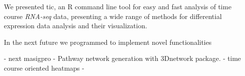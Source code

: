 We presented \gls{tic}, an R command line tool for easy and fast analysis of time course \textit{RNA-seq} data, presenting a wide range of methods for differential expression data analysis and their visualization.

In the next future we programmed to implement novel functionalities 

- next masigpro
- Pathway network generation with 3Dnetwork package.
- time course oriented heatmaps
- 